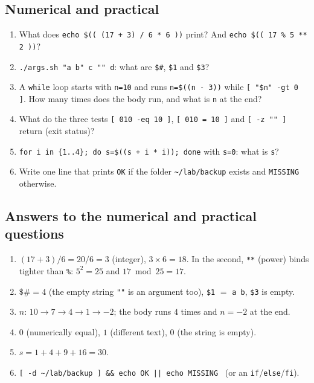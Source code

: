 \documentclass[11pt,a4paper]{article}
\begin{document}
\subsection*{Numerical and practical}
\begin{enumerate}[leftmargin=1.6em,resume]
  \item What does \texttt{echo \$(( (17 + 3) / 6 * 6 ))} print? And \texttt{echo \$(( 17 \% 5 ** 2 ))}?
  \item \texttt{./args.sh "a b" c "" d}: what are \texttt{\$\#}, \texttt{\$1} and \texttt{\$3}?
  \item A \texttt{while} loop starts with \texttt{n=10} and runs \texttt{n=\$((n - 3))} while \texttt{[ "\$n" -gt 0 ]}. How many times does the body run, and what is \texttt{n} at the end?
  \item What do the three tests \texttt{[ 010 -eq 10 ]}, \texttt{[ 010 = 10 ]} and \texttt{[ -z "" ]} return (exit status)?
  \item \texttt{for i in \{1..4\}; do s=\$((s + i * i)); done} with \texttt{s=0}: what is \texttt{s}?
  \item Write one line that prints \texttt{OK} if the folder \texttt{\textasciitilde/lab/backup} exists and \texttt{MISSING} otherwise.
\end{enumerate}

\subsection*{Answers to the numerical and practical questions}
\begin{enumerate}[leftmargin=1.6em,start=9]
  \item $(17+3)/6 = 20/6 = 3$ (integer), $3 \times 6 = 18$. In the second, \texttt{**} (power) binds tighter than \texttt{\%}: $5^2 = 25$ and $17 \bmod 25 = 17$.
  \item $\$\# = 4$ (the empty string \texttt{""} is an argument too), \texttt{\$1} $=$ \texttt{a b}, \texttt{\$3} is empty.
  \item $n$: $10 \to 7 \to 4 \to 1 \to -2$; the body runs $4$ times and $n = -2$ at the end.
  \item $0$ (numerically equal), $1$ (different text), $0$ (the string is empty).
  \item $s = 1 + 4 + 9 + 16 = 30$.
  \item \texttt{[ -d \textasciitilde/lab/backup ] \&\& echo OK || echo MISSING} \ (or an \texttt{if}/\texttt{else}/\texttt{fi}).
\end{enumerate}
\end{document}
